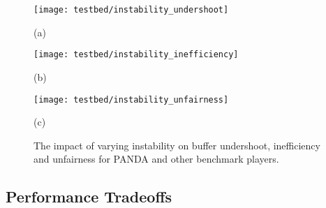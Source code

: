 \documentclass[conference]{IEEEtran}
\theoremstyle{plain}
\theoremstyle{definition}
\theoremstyle{plain}
\theoremstyle{plain}
\begin{document}
\begin{figure*}
\begin{centering}
\begin{minipage}[t]{0.66\columnwidth}\begin{center}
\texttt{[image: testbed/instability\_undershoot]}
\par\end{center}

\begin{center}
\vspace{-0.1in}
(a)
\par\end{center}\end{minipage} \begin{minipage}[t]{0.66\columnwidth}\begin{center}
\texttt{[image: testbed/instability\_inefficiency]}
\par\end{center}

\begin{center}
\vspace{-0.1in}
(b) 
\par\end{center}\end{minipage} \begin{minipage}[t]{0.66\columnwidth}\begin{center}
\texttt{[image: testbed/instability\_unfairness]}
\par\end{center}

\begin{center}
\vspace{-0.1in}
(c) 
\par\end{center}\end{minipage} 
\par\end{centering}

\vspace{-0.01in}

\caption{The impact of varying instability on buffer undershoot, inefficiency
and unfairness for PANDA and other benchmark players. }


\label{Flo:tradeoff} \vspace{-0.05in}
\end{figure*}



\subsection{Performance Tradeoffs}
\end{document}
